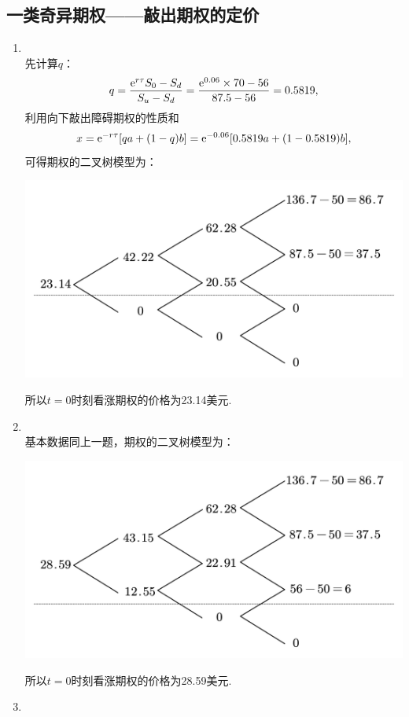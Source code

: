 \subsection{一类奇异期权——敲出期权的定价}
\begin{enumerate}
    \item \sol\\
    先计算$q$：
    \[q = \frac{\mathrm{e}^{r\tau}S_0 - S_d}{S_u - S_d} = \frac{\mathrm{e}^{0.06}\times 70-56}{87.5-56}=0.5819,\]
    利用向下敲出障碍期权的性质和
    \[x = \mathrm{e}^{-r\tau}[qa+(1-q)b]=\mathrm{e}^{-0.06}[0.5819a+(1-0.5819)b],\]
    可得期权的二叉树模型为：
    \begin{center}
        \includegraphics[scale=0.35]{CH3-4-1.pdf}
    \end{center}
    所以$t=0$时刻看涨期权的价格为23.14美元.
    \item \sol\\
    基本数据同上一题，期权的二叉树模型为：
    \begin{center}
        \includegraphics[scale=0.35]{CH3-4-2.pdf}
    \end{center}
    所以$t=0$时刻看涨期权的价格为28.59美元.
    \item \sol\\

\end{enumerate}
